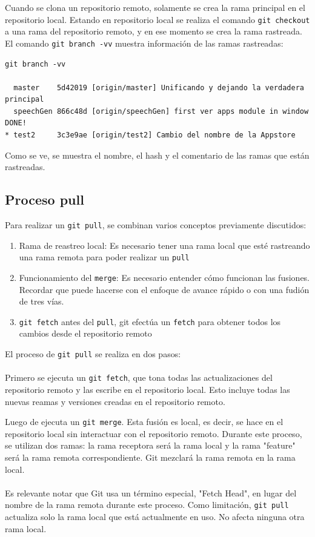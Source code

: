 Cuando se clona un repositorio remoto, solamente se crea la rama principal en el repositorio local. Estando en repositorio local se realiza el comando \texttt{git checkout} a una rama del repositorio remoto, y en ese momento se crea la rama rastreada. El comando \texttt{git branch -vv} muestra información de las ramas rastreadas:

\begin{verbatim}
git branch -vv

  master    5d42019 [origin/master] Unificando y dejando la verdadera principal
  speechGen 866c48d [origin/speechGen] first ver apps module in window DONE!
* test2     3c3e9ae [origin/test2] Cambio del nombre de la Appstore
\end{verbatim}

Como se ve, se muestra el nombre, el hash y el comentario de las ramas que están rastreadas.

\subsection{Proceso pull}

Para realizar un \texttt{git pull}, se combinan varios conceptos previamente discutidos:

\begin{enumerate}
    \item Rama de reastreo local: Es necesario tener una rama local que esté rastreando una rama remota para poder realizar un \texttt{pull}
    \item Funcionamiento del \texttt{merge}: Es necesario entender cómo funcionan las fusiones. Recordar que puede hacerse con el enfoque de avance rápido o con una fudión de tres vías.
    \item \texttt{git fetch} antes del \texttt{pull}, git efectúa un \texttt{fetch} para obtener todos los cambios desde el repositorio remoto
\end{enumerate}

El proceso de \texttt{git pull} se realiza en dos pasos:\\\\
Primero se ejecuta un \texttt{git fetch}, que tona todas las actualizaciones del repositorio remoto y las escribe en el repositorio local. Esto incluye todas las nuevas reamas y versiones creadas en el repositorio remoto.

Luego de ejecuta un \texttt{git merge}. Esta fusión es local, es decir, se hace en el repositorio local sin interactuar con el repositorio remoto. Durante este proceso, se utilizan dos ramas: la rama receptora será la rama local y la rama "feature" será la rama remota correspondiente. Git mezclará la rama remota en la rama local. \\\\
Es relevante notar que Git usa un término especial, "Fetch Head", en lugar del nombre de la rama remota durante este proceso. Como limitación, \texttt{git pull} actualiza solo la rama local que está actualmente en uso. No afecta ninguna otra rama local.



